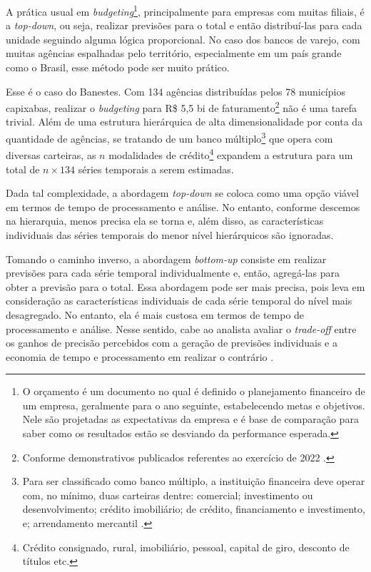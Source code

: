 \documentclass[
  12pt,
  twoside,
  openright,
  a4paper,
  chapter=TITLE,
  section=TITLE,
  brazil]{abntex2}
\begin{document}
A prática usual em \emph{budgeting}\footnote{O orçamento é um documento
  no qual é definido o planejamento financeiro de um empresa, geralmente
  para o ano seguinte, estabelecendo metas e objetivos. Nele são
  projetadas as expectativas da empresa e é base de comparação para
  saber como os resultados estão se desviando da performance esperada.},
principalmente para empresas com muitas filiais, é a \emph{top-down}, ou
seja, realizar previsões para o total e então distribuí-las para cada
unidade seguindo alguma lógica proporcional. No caso dos bancos de
varejo, com muitas agências espalhadas pelo território, especialmente em
um país grande como o Brasil, esse método pode ser muito prático.

Esse é o caso do Banestes. Com 134 agências distribuídas pelos 78
municípios capixabas, realizar o \emph{budgeting} para R\$ 5,5 bi de
faturamento\footnote{Conforme demonstrativos publicados referentes ao
  exercício de 2022
  \autocite{banco_do_estado_do_espirito_santo_demonstracoes_2022}.} não
é uma tarefa trivial. Além de uma estrutura hierárquica de alta
dimensionalidade por conta da quantidade de agências, se tratando de um
banco múltiplo\footnote{Para ser classificado como banco múltiplo, a
  instituição financeira deve operar com, no mínimo, duas carteiras
  dentre: comercial; investimento ou desenvolvimento; crédito
  imobiliário; de crédito, financiamento e investimento, e; arrendamento
  mercantil \autocite{conselho_monetario_nacional_resolucao_1994}.} que
opera com diversas carteiras, as \(n\) modalidades de crédito\footnote{Crédito
  consignado, rural, imobiliário, pessoal, capital de giro, desconto de
  títulos etc.} expandem a estrutura para um total de \(n \times 134\)
séries temporais a serem estimadas.

Dada tal complexidade, a abordagem \emph{top-down} se coloca como uma
opção viável em termos de tempo de processamento e análise. No entanto,
conforme descemos na hierarquia, menos precisa ela se torna e, além
disso, as características individuais das séries temporais do menor
nível hierárquicos são ignoradas.

Tomando o caminho inverso, a abordagem \emph{bottom-up} consiste em
realizar previsões para cada série temporal individualmente e, então,
agregá-las para obter a previsão para o total. Essa abordagem pode ser
mais precisa, pois leva em consideração as características individuais
de cada série temporal do nível mais desagregado. No entanto, ela é mais
custosa em termos de tempo de processamento e análise. Nesse sentido,
cabe ao analista avaliar o \emph{trade-off} entre os ganhos de precisão
percebidos com a geração de previsões individuais e a economia de tempo
e processamento em realizar o contrário
\autocite{gross_disaggregation_1990}.
\end{document}
